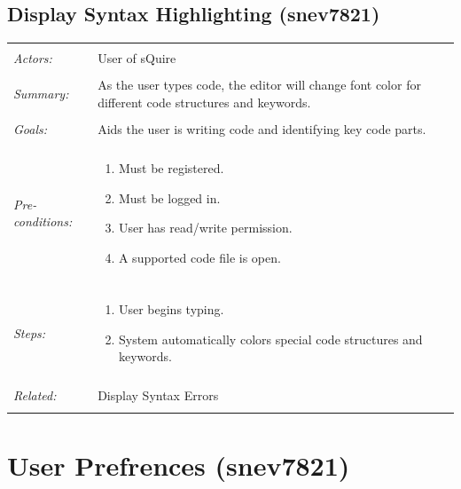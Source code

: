 \documentclass[11pt]{report}
\begin{document}
\subsection{Display Syntax Highlighting  (snev7821)}
\begin{tabular}{ p{2cm} p{12cm} }
\hline
\\
	\textit{Actors:} & User of sQuire \\
	\\
	\textit{Summary:} &  As the user types code, the editor will change font color for different code structures and keywords. \\
	\\
	\textit{Goals:} & Aids the user is writing code and identifying key code parts. \\
	\\
	\textit{Pre-conditions:} & \begin{enumerate}
		\item Must be registered.
		\item Must be logged in.
		\item User has read/write permission.
		\item A supported code file is open.
	\end{enumerate} \\
	\\
	\textit{Steps:} & \begin{enumerate}
		\item User begins typing.
		\item System automatically colors special code structures and keywords.
	\end{enumerate} \\
	\\
	\textit{Related:} & Display Syntax Errors \\
	\\
\hline
\end{tabular}
\newpage


\section{User Prefrences (snev7821)}
\end{document}
